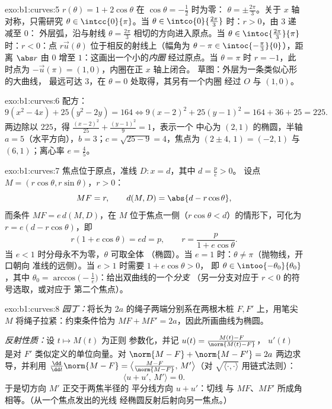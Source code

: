 \begin{solution}{exo:b1:curves:5}
$r(\theta) = 1 + 2\cos\theta$ 在 $\cos\theta = -\frac12$ 时为零：
$\theta = \pm\frac{2\pi}{3}$。关于 $x$ 轴对称，只需研究
$\theta \in \intcc{0}{\pi}$。当 $\theta \in
\intco{0}{\frac{2\pi}{3}}$ 时：$r > 0$，由 $3$ 递减至 $0$：
外层弧，沿与射线 $\theta =
\frac{2\pi}{3}$ 相切的方向进入原点。当 $\theta \in \intoc{\frac{2\pi}{3}}{\pi}$ 时：$r <
0$：点 $r\vec u(\theta)$ 位于相反的射线上（幅角为
$\theta - \pi \in \intoc{-\frac\pi3}{0}$），距离 $\abs r$
由 $0$ 增至 $1$：这画出一个小的\emph{内圈}
经过原点。当 $\theta = \pi$ 时 $r = -1$，此时点为
$-\vec u(\pi) = (1, 0)$，内圈在正 $x$ 轴上闭合。
草图：外层为一条类似心形的大曲线，
最远可达 $3$，在 $\theta = 0$ 处取得，其另有一个内圈
经过 $O$ 与 $(1,0)$。
\end{solution}

\begin{solution}{exo:b1:curves:6}
配方：
\[
9(x^2 - 4x) + 25(y^2 - 2y) = 164
\iff 9(x-2)^2 + 25(y-1)^2 = 164 + 36 + 25 = 225 .
\]
两边除以 $225$，得 $\frac{(x-2)^2}{25} + \frac{(y-1)^2}{9} = 1$，表示一个
中心为 $(2, 1)$ 的椭圆，半轴 $a = 5$（水平方向），$b =
3$；$c = \sqrt{25 - 9} = 4$，焦点为 $(2 \pm 4,\, 1) = (-2, 1)$ 与
$(6, 1)$；离心率 $e = \frac45$。
\end{solution}

\begin{solution}{exo:b1:curves:7}
焦点位于原点，准线 $D: x = d$，其中 $d = \frac pe > 0$。
设点 $M = (r\cos\theta, r\sin\theta)$，$r > 0$：
\[
MF = r,
\qquad
d(M, D) = \abs{d - r\cos\theta},
\]
而条件 $MF = e\,d(M, D)$，在 $M$
位于焦点一侧（$r\cos\theta < d$）的情形下，可化为 $r
= e(d - r\cos\theta)$，即
\[
r(1 + e\cos\theta) = ed = p,
\qquad
r = \frac{p}{1 + e\cos\theta} .
\]
当 $e < 1$ 时分母永不为零，$\theta$ 可取全体
（椭圆）。当 $e = 1$ 时：$\theta \neq \pi$（抛物线，开口朝向
准线的远侧）。当 $e > 1$ 时需要 $1 + e\cos\theta > 0$，
即 $\theta \in \intoo{-\theta_0}{\theta_0}$，其中 $\theta_0 =
\arccos\bigl(-\frac1e\bigr)$：给出双曲线的一个\emph{分支}
（另一分支对应于 $r < 0$ 的符号选取，或对应于
第二个焦点）。
\end{solution}

\begin{solution}{exo:b1:curves:8}
\emph{园丁：}将长为 $2a$ 的绳子两端分别系在两根木桩 $F,
F'$ 上，用笔尖 $M$ 将绳子拉紧：约束条件恰为
$MF + MF' = 2a$，因此所画曲线为椭圆。

\emph{反射性质：}设 $t \mapsto M(t)$ 为正则
参数化，并记 $u(t) = \frac{M(t) - F}{\norm{M(t) - F}}$，
$u'(t)$ 是对 $F'$ 类似定义的单位向量。对
$\norm{M - F} + \norm{M - F'} = 2a$ 两边求导，并利用 $\frac{\dd}{\dd
t}\norm{M - F} = \bigl\langle \frac{M - F}{\norm{M-F}},\,
M'\bigr\rangle$（对 $\sqrt{\langle\cdot,\cdot\rangle}$ 用链式法则）：
\[
\bigl\langle u + u',\, M'\bigr\rangle = 0 .
\]
于是切方向 $M'$ 正交于两焦半径的
平分线方向 $u + u'$：切线
与 $MF$、$MF'$ 所成角相等。（从一个焦点发出的光线
经椭圆反射后射向另一焦点。）
\end{solution}

